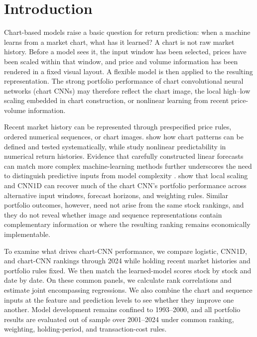 \section{Introduction}\label{sec:introduction}

Chart-based models raise a basic question for return prediction: when a machine learns from a market chart, what has it learned? A chart is not raw market history. Before a model sees it, the input window has been selected, prices have been scaled within that window, and price and volume information has been rendered in a fixed visual layout. A flexible model is then applied to the resulting representation. The strong portfolio performance of chart convolutional neural networks (chart CNNs) \parencite{reimagining_price_trends_jiang} may therefore reflect the chart image, the local high--low scaling embedded in chart construction, or nonlinear learning from recent price-volume information.

Recent market history can be represented through prespecified price rules, ordered numerical sequences, or chart images. \Textcite{loFoundationsTechnicalAnalysis2000} show how chart patterns can be defined and tested systematically, while \textcite{murrayChartingMachines2024} study nonlinear predictability in numerical return histories. Evidence that carefully constructed linear forecasts can match more complex machine-learning methods further underscores the need to distinguish predictive inputs from model complexity \parencite{chengMachineLearningNecessity2025}. \Textcite{reimagining_price_trends_jiang} show that local scaling and CNN1D can recover much of the chart CNN's portfolio performance across alternative input windows, forecast horizons, and weighting rules. Similar portfolio outcomes, however, need not arise from the same stock rankings, and they do not reveal whether image and sequence representations contain complementary information or where the resulting ranking remains economically implementable.

To examine what drives chart-CNN performance, we compare logistic, CNN1D, and chart-CNN rankings through 2024 while holding recent market histories and portfolio rules fixed. We then match the learned-model scores stock by stock and date by date. On these common panels, we calculate rank correlations and estimate joint encompassing regressions. We also combine the chart and sequence inputs at the feature and prediction levels to see whether they improve one another. Model development remains confined to 1993--2000, and all portfolio results are evaluated out of sample over 2001--2024 under common ranking, weighting, holding-period, and transaction-cost rules.

